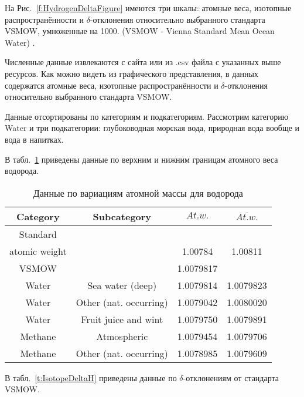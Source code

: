 \documentclass[a5paper,openany]{book}
\newcommand{\ov}{\overline}
\newcommand{\un}{\underline}
\begin{document}
На Рис.~\ref{f:HydrogenDeltaFigure}  имеются три шкалы: атомные веса, изотопные распространённости и $\delta$-отклонения относительно выбранного стандарта VSMOW, умноженные на 1000.
(VSMOW - Vienna Standard Mean Ocean Water) \cite{VSMOW}. 

Численные данные извлекаются с сайта или из .csv файла с указанных выше ресурсов. Как можно видеть из графического представления, в данных содержатся атомные веса, изотопные распространённости и $\delta$-отклонения относительно выбранного стандарта VSMOW.

Данные отсортированы по категориям и подкатегориям. Рассмотрим категорию Water и три подкатегории: глубоководная морская вода, природная вода вообще и вода в напитках.


В табл.~\ref{t:AtomicWeightH} приведены данные по верхним и нижним границам атомного веса водорода.

\begin{table}[h]
	\centering
				{\footnotesize       
		\begin{tabular}{|c|c|c|c|}
			\hline
			Category &	Subcategory & $\un{At. w.}$	&  $\ov{At. w.}$ \\
			\hline
			Standard  & ~& ~ & ~    \\
			atomic weight & ~& 1.00784 & 1.00811   \\
			\hline
			VSMOW & ~ & 1.0079817  & ~  \\
			\hline
			Water & Sea water (deep)& 1.0079814 & 1.0079823  \\
			Water  & Other (nat. occurring)& 1.0079042 & 1.0080020  \\
			Water  & Fruit juice and wint& 1.0079750 & 1.0079891   \\ 
			\hline
			Methane  & Atmospheric &  1.0079454 & 1.0079706 \\
			Methane  & Other (nat. occurring)  & 1.0078985 & 1.0079609 \\ 
			\hline
		\end{tabular}
	}
	\caption{Данные по  вариациям атомной массы для водорода}
	\label{t:AtomicWeightH}
\end{table}

В табл.~\ref{t:IsotopeDeltaH} приведены данные по $\delta$-отклонениям от стандарта VSMOW.	
\end{document}
